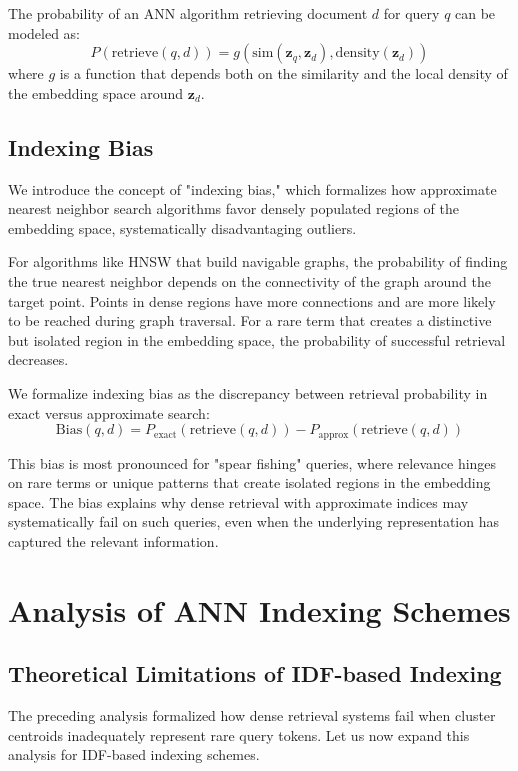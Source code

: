 \documentclass[manuscript]{acmart}
\begin{document}
The probability of an ANN algorithm retrieving document $d$ for query $q$ can be modeled as:
\begin{equation}
P(\text{retrieve}(q, d)) = g(\text{sim}(\mathbf{z}_q, \mathbf{z}_d), \text{density}(\mathbf{z}_d))
\end{equation}
where $g$ is a function that depends both on the similarity and the local density of the embedding space around $\mathbf{z}_d$.

\subsection{Indexing Bias}
We introduce the concept of "indexing bias," which formalizes how approximate nearest neighbor search algorithms favor densely populated regions of the embedding space, systematically disadvantaging outliers. 

For algorithms like HNSW that build navigable graphs, the probability of finding the true nearest neighbor depends on the connectivity of the graph around the target point. Points in dense regions have more connections and are more likely to be reached during graph traversal. For a rare term that creates a distinctive but isolated region in the embedding space, the probability of successful retrieval decreases.

We formalize indexing bias as the discrepancy between retrieval probability in exact versus approximate search:
\begin{equation}
\text{Bias}(q, d) = P_{\text{exact}}(\text{retrieve}(q, d)) - P_{\text{approx}}(\text{retrieve}(q, d))
\end{equation}

This bias is most pronounced for "spear fishing" queries, where relevance hinges on rare terms or unique patterns that create isolated regions in the embedding space. The bias explains why dense retrieval with approximate indices may systematically fail on such queries, even when the underlying representation has captured the relevant information.

\section{Analysis of ANN Indexing Schemes}

\subsection{Theoretical Limitations of IDF-based Indexing}
The preceding analysis formalized how dense retrieval systems fail when cluster centroids inadequately represent rare query tokens. Let us now expand this analysis for IDF-based indexing schemes.
\end{document}
